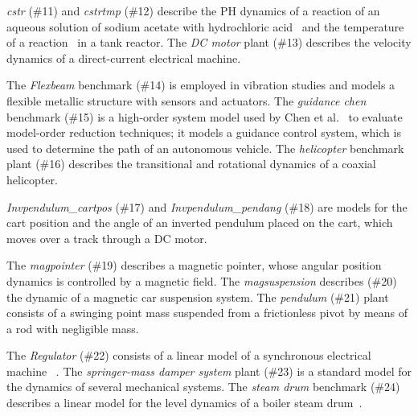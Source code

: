 \documentclass[twocolumn]{autart}    %
\begin{document}
\textit{cstr} (\#11) and \textit{cstrtmp} (\#12) describe the PH dynamics of a reaction 
of an aqueous solution of sodium acetate with hydrochloric acid~\cite{cstr} and 
the temperature of a reaction~\cite{astrom2006advanced} in a 
tank reactor. The \textit{DC motor} plant (\#13) describes the velocity 
dynamics of a 
direct-current electrical machine. 

The \textit{Flexbeam} benchmark (\#14) is 
employed in vibration studies and models  
a flexible metallic structure with sensors and actuators. 
The \textit{guidance chen} benchmark (\#15) is a high-order system model used by Chen et al.~\cite{CHEN1979389} to evaluate 
model-order reduction techniques; it models a guidance control system, 
which is used to determine the path of an autonomous vehicle. 
The \textit{helicopter} benchmark plant (\#16) describes the transitional and rotational dynamics 
of a coaxial helicopter.

\textit{Invpendulum\_cartpos} (\#17) and \textit{Invpendulum\_pendang} (\#18) 
are models for the cart position and the angle of an inverted pendulum placed on the cart,  
which moves over a track through a DC motor.

The \textit{magpointer} (\#19) describes a magnetic pointer, 
whose angular position dynamics is controlled by a magnetic field. 
The \textit{magsuspension} describes (\#20) the dynamic of a magnetic car suspension system. 
The \textit{pendulum} (\#21) plant consists of a swinging point mass suspended from a frictionless pivot by means of a rod with negligible mass.  

The \textit{Regulator} (\#22) consists of a linear model of a synchronous electrical machine%
~\cite{KOKOTOVIC198023}. 
The \textit{springer-mass damper system} plant (\#23) is a standard model for the dynamics of several mechanical systems. 
The \textit{steam drum} benchmark (\#24) describes a linear model for the level dynamics of a boiler steam drum~\cite{boiler}. 
\end{document}
